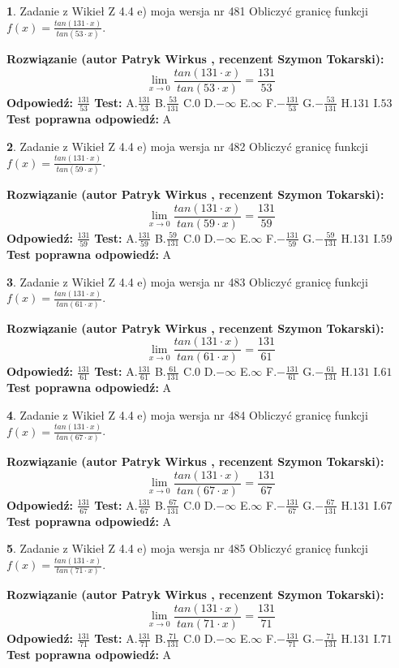 \documentclass[12pt, a4paper]{article}
\theoremstyle{definition} %
\newtheorem{zad}{}
\newcommand{\zadStart}[1]{\begin{zad}#1\newline}
\newcommand{\zadStop}{\end{zad}}
\newcommand{\rozwStart}[2]{\noindent \textbf{Rozwiązanie (autor #1 , recenzent #2): }\newline}
\newcommand{\rozwStop}{\newline}
\newcommand{\odpStart}{\noindent \textbf{Odpowiedź:}\newline}
\newcommand{\odpStop}{\newline}
\newcommand{\testStart}{\noindent \textbf{Test:}\newline}
\newcommand{\testStop}{\newline}
\newcommand{\kluczStart}{\noindent \textbf{Test poprawna odpowiedź:}\newline}
\newcommand{\kluczStop}{\newline}
\begin{document}
\zadStart{Zadanie z Wikieł Z 4.4 e) moja wersja nr 481}
Obliczyć granicę funkcji $f(x)=\frac{tan(131\cdot x)}{tan(53\cdot x)}$.
\zadStop
\rozwStart{Patryk Wirkus}{Szymon Tokarski}
$$\lim\limits_{x\to 0}\frac{tan(131\cdot x)}{tan(53\cdot x)}=
\frac{131}{53}$$
\rozwStop
\odpStart
$\frac{131}{53}$
\odpStop
\testStart
A.$\frac{131}{53}$
B.$\frac{53}{131}$
C.$0$
D.$-\infty$
E.$\infty$
F.$-\frac{131}{53}$
G.$-\frac{53}{131}$
H.$131$
I.$53$
\testStop
\kluczStart
A
\kluczStop



\zadStart{Zadanie z Wikieł Z 4.4 e) moja wersja nr 482}
Obliczyć granicę funkcji $f(x)=\frac{tan(131\cdot x)}{tan(59\cdot x)}$.
\zadStop
\rozwStart{Patryk Wirkus}{Szymon Tokarski}
$$\lim\limits_{x\to 0}\frac{tan(131\cdot x)}{tan(59\cdot x)}=
\frac{131}{59}$$
\rozwStop
\odpStart
$\frac{131}{59}$
\odpStop
\testStart
A.$\frac{131}{59}$
B.$\frac{59}{131}$
C.$0$
D.$-\infty$
E.$\infty$
F.$-\frac{131}{59}$
G.$-\frac{59}{131}$
H.$131$
I.$59$
\testStop
\kluczStart
A
\kluczStop



\zadStart{Zadanie z Wikieł Z 4.4 e) moja wersja nr 483}
Obliczyć granicę funkcji $f(x)=\frac{tan(131\cdot x)}{tan(61\cdot x)}$.
\zadStop
\rozwStart{Patryk Wirkus}{Szymon Tokarski}
$$\lim\limits_{x\to 0}\frac{tan(131\cdot x)}{tan(61\cdot x)}=
\frac{131}{61}$$
\rozwStop
\odpStart
$\frac{131}{61}$
\odpStop
\testStart
A.$\frac{131}{61}$
B.$\frac{61}{131}$
C.$0$
D.$-\infty$
E.$\infty$
F.$-\frac{131}{61}$
G.$-\frac{61}{131}$
H.$131$
I.$61$
\testStop
\kluczStart
A
\kluczStop



\zadStart{Zadanie z Wikieł Z 4.4 e) moja wersja nr 484}
Obliczyć granicę funkcji $f(x)=\frac{tan(131\cdot x)}{tan(67\cdot x)}$.
\zadStop
\rozwStart{Patryk Wirkus}{Szymon Tokarski}
$$\lim\limits_{x\to 0}\frac{tan(131\cdot x)}{tan(67\cdot x)}=
\frac{131}{67}$$
\rozwStop
\odpStart
$\frac{131}{67}$
\odpStop
\testStart
A.$\frac{131}{67}$
B.$\frac{67}{131}$
C.$0$
D.$-\infty$
E.$\infty$
F.$-\frac{131}{67}$
G.$-\frac{67}{131}$
H.$131$
I.$67$
\testStop
\kluczStart
A
\kluczStop



\zadStart{Zadanie z Wikieł Z 4.4 e) moja wersja nr 485}
Obliczyć granicę funkcji $f(x)=\frac{tan(131\cdot x)}{tan(71\cdot x)}$.
\zadStop
\rozwStart{Patryk Wirkus}{Szymon Tokarski}
$$\lim\limits_{x\to 0}\frac{tan(131\cdot x)}{tan(71\cdot x)}=
\frac{131}{71}$$
\rozwStop
\odpStart
$\frac{131}{71}$
\odpStop
\testStart
A.$\frac{131}{71}$
B.$\frac{71}{131}$
C.$0$
D.$-\infty$
E.$\infty$
F.$-\frac{131}{71}$
G.$-\frac{71}{131}$
H.$131$
I.$71$
\testStop
\kluczStart
A
\kluczStop
\end{document}
